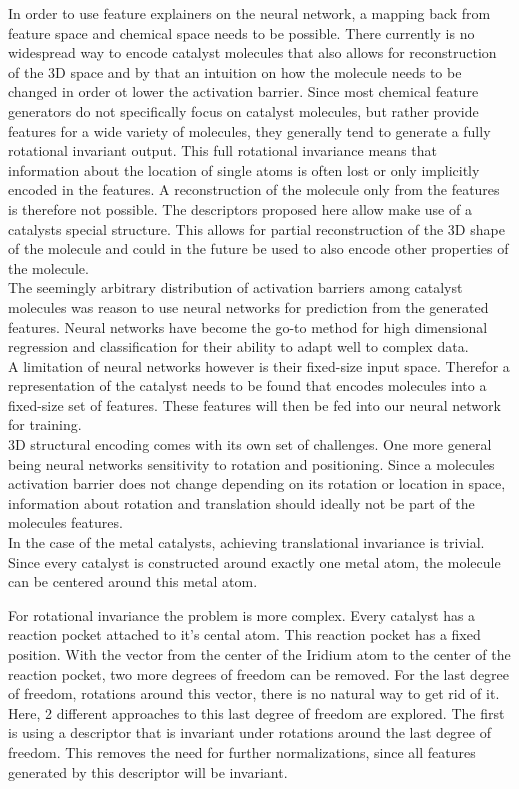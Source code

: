 In order to use feature explainers on the neural network, a mapping back from feature space and chemical space needs to be possible.
There currently is no widespread way to encode catalyst molecules that also allows for 
reconstruction of the 3D space and by that an intuition on how the molecule needs to be changed in order ot lower the activation barrier.
Since most chemical feature generators do not specifically focus on catalyst molecules,
but rather provide features for a wide variety of molecules, they generally tend to generate a fully rotational invariant output.
This full rotational invariance means that information about the location of single atoms is often lost or only implicitly encoded in the features.
A reconstruction of the molecule only from the features is therefore not possible.
The descriptors proposed here allow make use of a catalysts special structure.
This allows for partial reconstruction of the 3D shape of the molecule and could in the future be used to also encode 
other properties of the molecule.
\\

The seemingly arbitrary distribution of activation barriers among catalyst molecules  was reason to use neural networks for prediction from the generated features.
Neural networks have become the go-to method for high dimensional regression and classification for their ability to adapt well to complex data.
\\
A limitation of neural networks however is their fixed-size input space.
Therefor a representation of the catalyst needs to be found that encodes molecules into a fixed-size set of features.
These features will then be fed into our neural network for training. 
\\
3D structural encoding comes with its own set of challenges. 
One more general being neural networks sensitivity to rotation and positioning.
Since a molecules activation barrier does not change depending on its rotation or location in space, 
information about rotation and translation should ideally not be part of the molecules features.
\\
In the case of the metal catalysts, achieving translational invariance is trivial.
Since every catalyst is constructed around exactly one metal atom, the molecule can be centered around this metal atom.

For rotational invariance the problem is more complex.
Every catalyst has a reaction pocket attached to it's cental atom.
This reaction pocket has a fixed position.
With the vector from the center of the Iridium atom to the center of the reaction pocket, two more degrees of freedom can be removed.
For the last degree of freedom, rotations around this vector, there is no natural way to get rid of it.
Here, 2 different approaches to this last degree of freedom are explored.
The first is using a descriptor that is invariant under rotations around the last degree of freedom.
This removes the need for further normalizations, since all features generated by this descriptor will be invariant.


